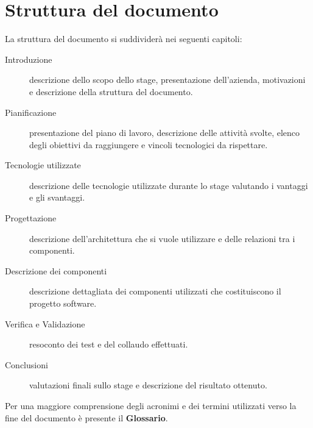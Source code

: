 \section{Struttura del documento}
La struttura del documento si suddividerà nei seguenti capitoli:
\begin{description}
	\item [Introduzione] descrizione dello scopo dello stage, presentazione dell'azienda, motivazioni e descrizione della struttura del documento.
	\item [Pianificazione] presentazione del piano di lavoro, descrizione delle attività svolte, elenco degli obiettivi da raggiungere e vincoli tecnologici da rispettare.
	\item [Tecnologie utilizzate] descrizione delle tecnologie utilizzate durante lo stage valutando i vantaggi e gli svantaggi.
	\item [Progettazione] descrizione dell'architettura che si vuole utilizzare e delle relazioni tra i componenti.
	\item [Descrizione dei componenti] descrizione dettagliata dei componenti utilizzati che costituiscono il progetto software.
	\item [Verifica e Validazione] resoconto dei test e del collaudo effettuati.
	\item [Conclusioni] valutazioni finali sullo stage e descrizione del risultato ottenuto.
\end{description}
Per una maggiore comprensione degli acronimi e dei termini utilizzati verso la fine del documento è presente il \textbf{Glossario}. 
 